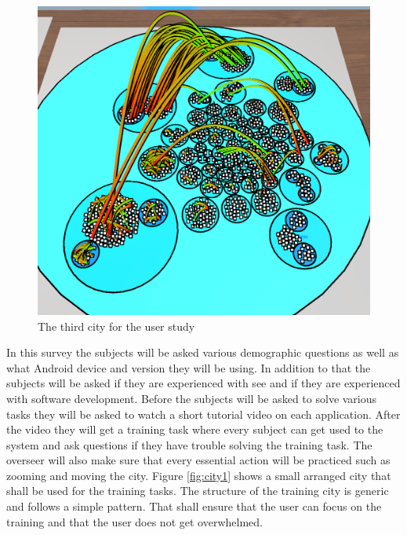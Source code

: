 \begin{figure}[htb]
  \centering
  \includegraphics[width=1\textwidth]{Evaluation/img/city_3.png}
  \caption{The third \gls{city} for the user study}\label{fig:city3}
\end{figure}
In this survey the subjects will be asked various demographic questions as well as what Android device and version they will be using.
In addition to that the subjects will be asked if they are experienced with \gls{see} and if they are experienced with software development.
Before the subjects will be asked to solve various tasks they will be asked to watch a short tutorial video on each application.
After the video they will get a training task where every subject can get used to the system and ask questions if they have trouble solving the training task.
The overseer will also make sure that every essential action will be practiced such as zooming and moving the \gls{city}.
Figure \ref{fig:city1} shows a small arranged \gls{city} that shall be used for the training tasks.
The structure of the training \gls{city} is generic and follows a simple pattern.
That shall ensure that the user can focus on the training and that the user does not get overwhelmed.

